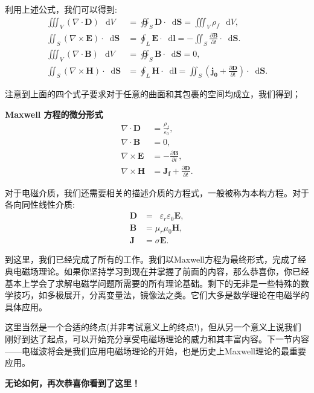 \documentclass[12pt,a4paper,oneside]{report}
\theoremstyle{definition}
\theoremstyle{remark}
\newcommand{\mb}[1]{\mathbf{#1}}
\renewcommand{\d}{\mathop{}\!\mathrm{d}}
\renewcommand{\v}{\mathop{}\!\varepsilon}
\begin{document}
利用上述公式，我们可以得到:
\begin{align*}
\iiint_{V} (\nabla\cdot\mathbf{D})\,\d V &= \oiint_{S} \mathbf{D}\cdot \d\mathbf{S} = \iiint_{V} \rho_f\,\d V, \\[4pt]
\iint_{S} (\nabla\times\mathbf{E})\cdot \d\mathbf{S} &= \oint_{L} \mathbf{E}\cdot \d\mathbf{l}  =-\iint_S \frac{\partial \mathbf{B}}{\partial t}\cdot \d \mathbf{S}.\\[4pt]
\iiint_{V} (\nabla\cdot\mathbf{B})\,\d V &= \oiint_{S} \mathbf{B}\cdot \d\mathbf{S} = 0, \\[4pt]
\iint_{S} (\nabla\times\mathbf{H})\cdot \d\mathbf{S} &= \oint_{L} \mathbf{H}\cdot \d\mathbf{l} = \iint_S (\mb{j_0}+\frac{\partial \mb{D}}{\partial t})\cdot \d \mb{S}.
\end{align*}

注意到上面的四个式子要求对于任意的曲面和其包裹的空间均成立，我们得到；

\textbf{Maxwell 方程的微分形式}
\begin{align*}
\nabla\cdot\mathbf{D} &= \frac{\rho_f}{\varepsilon_0}, \\[4pt]
\nabla\cdot\mathbf{B} &= 0, \\[4pt]
\nabla\times\mathbf{E} &= -\frac{\partial\mathbf{B}}{\partial t}, \\[4pt]
\nabla\times\mathbf{H} &= \mathbf{J_f} + \frac{\partial\mathbf{D}}{\partial t}.
\end{align*}

对于电磁介质，我们还需要相关的描述介质的方程式，一般被称为本构方程。对于各向同性线性介质:
\begin{align*}
\mathbf{D} &= \v_r\varepsilon_0 \mathbf{E}, \\[4pt]
\mathbf{B} &= \mu_r\mu_0 \mathbf{H}, \\[4pt]
\mathbf{J} &= \sigma \mathbf{E}.
\end{align*}

到这里，我们已经完成了所有的工作。我们以Maxwell方程为最终形式，完成了经典电磁场理论。如果你坚持学习到现在并掌握了前面的内容，那么恭喜你，你已经基本上学会了求解电磁学问题所需要的所有理论基础。剩下的无非是一些特殊的数学技巧，如多极展开，分离变量法，镜像法之类。它们大多是数学理论在电磁学的具体应用。

这里当然是一个合适的终点(并非考试意义上的终点!)，但从另一个意义上说我们刚好到达了起点，可以开始充分享受电磁场理论的威力和其丰富内容。下一节内容——电磁波将会是我们应用电磁场理论的开始，也是历史上Maxwell理论的最重要应用。
\begin{center}
  \textbf{无论如何，再次恭喜你看到了这里！}
\end{center}
\end{document}
